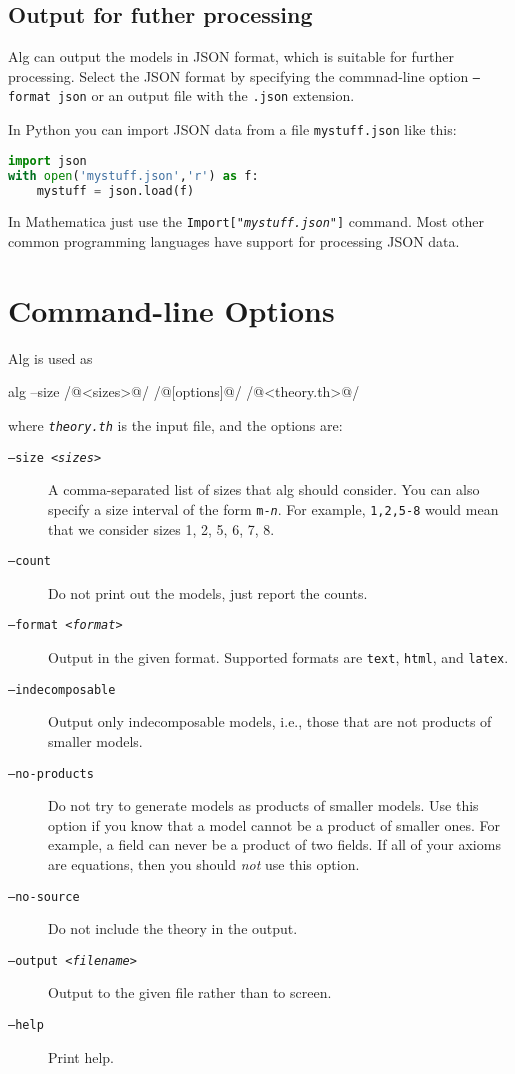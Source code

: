 \documentclass{article}
\begin{document}
\subsection{Output for futher processing}

Alg can output the models in JSON format, which is suitable for
further processing. Select the JSON format by specifying the
commnad-line option \texttt{--format json} or an output file with the
\texttt{.json} extension.

In Python you can import JSON data from a file
\texttt{mystuff.json} like this:
%
\begin{lstlisting}[language=python,basicstyle=\ttfamily\small]
import json
with open('mystuff.json','r') as f:
    mystuff = json.load(f)
\end{lstlisting}
%
In Mathematica just use the \texttt{Import["\textit{mystuff.json}"]}
command. Most other common programming languages have support for
processing JSON data.


\section{Command-line Options}
\label{sec:command-line-options}

Alg is used as
%
\begin{shell}
alg --size /@<sizes>@/ /@[options]@/ /@<theory.th>@/
\end{shell}
%
where \texttt{\textit{theory.th}} is the input file, and the options are:
%
\begin{description}
\item[\texttt{--size \textit{<sizes>}}]
  A comma-separated list of sizes that alg should consider. You can
  also specify a size interval of the form
  \texttt{\texttt{m}-\textit{n}}. For example, \texttt{1,2,5-8} would
  mean that we consider sizes 1, 2, 5, 6, 7, 8.
\item[\texttt{--count}]
  Do not print out the models, just report the counts.
\item[\texttt{--format \textit{<format>}}]
  Output in the given format. Supported formats are \texttt{text},
  \texttt{html}, and \texttt{latex}.
\item[\texttt{--indecomposable}]
  Output only indecomposable models, i.e., those that are not products
  of smaller models.
\item[\texttt{--no-products}]
  Do not try to generate models as products of smaller models. Use
  this option if you know that a model cannot be a product of smaller
  ones. For example, a field can never be a product of two fields. If
  all of your axioms are equations, then you should \emph{not} use
  this option.
\item[\texttt{--no-source}]
  Do not include the theory in the output.
\item[\texttt{--output \textit{<filename>}}]
  Output to the given file rather than to screen.
\item[\texttt{--help}]
  Print help.
\end{description}
\end{document}
